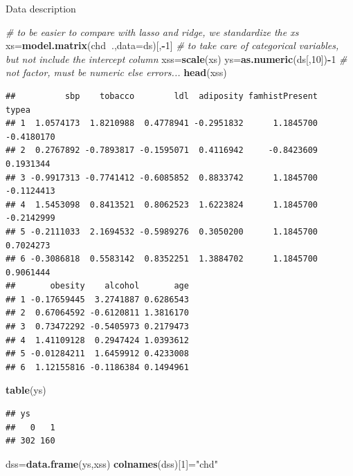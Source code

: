 \documentclass[
  ignorenonframetext,
]{beamer}
\newenvironment{Shaded}{\begin{snugshade}}{\end{snugshade}}
\newcommand{\CommentTok}[1]{\textcolor[rgb]{0.56,0.35,0.01}{\textit{#1}}}
\newcommand{\DataTypeTok}[1]{\textcolor[rgb]{0.13,0.29,0.53}{#1}}
\newcommand{\DecValTok}[1]{\textcolor[rgb]{0.00,0.00,0.81}{#1}}
\newcommand{\KeywordTok}[1]{\textcolor[rgb]{0.13,0.29,0.53}{\textbf{#1}}}
\newcommand{\NormalTok}[1]{#1}
\newcommand{\OperatorTok}[1]{\textcolor[rgb]{0.81,0.36,0.00}{\textbf{#1}}}
\newcommand{\StringTok}[1]{\textcolor[rgb]{0.31,0.60,0.02}{#1}}
\begin{document}
\begin{frame}[fragile]
\begin{block}{Data description}
\begin{Shaded}
\begin{Highlighting}[]
\CommentTok{# to be easier to compare with lasso and ridge, we standardize the xs}
\NormalTok{xs=}\KeywordTok{model.matrix}\NormalTok{(chd}\OperatorTok{~}\NormalTok{.,}\DataTypeTok{data=}\NormalTok{ds)[,}\OperatorTok{-}\DecValTok{1}\NormalTok{] }\CommentTok{# to take care of categorical variables, but not include the intercept column}
\NormalTok{xss=}\KeywordTok{scale}\NormalTok{(xs)}
\NormalTok{ys=}\KeywordTok{as.numeric}\NormalTok{(ds[,}\DecValTok{10}\NormalTok{])}\OperatorTok{-}\DecValTok{1} \CommentTok{# not factor, must be numeric else errors...}
\KeywordTok{head}\NormalTok{(xss)}
\end{Highlighting}
\end{Shaded}

\begin{verbatim}
##          sbp    tobacco        ldl  adiposity famhistPresent      typea
## 1  1.0574173  1.8210988  0.4778941 -0.2951832      1.1845700 -0.4180170
## 2  0.2767892 -0.7893817 -0.1595071  0.4116942     -0.8423609  0.1931344
## 3 -0.9917313 -0.7741412 -0.6085852  0.8833742      1.1845700 -0.1124413
## 4  1.5453098  0.8413521  0.8062523  1.6223824      1.1845700 -0.2142999
## 5 -0.2111033  2.1694532 -0.5989276  0.3050200      1.1845700  0.7024273
## 6 -0.3086818  0.5583142  0.8352251  1.3884702      1.1845700  0.9061444
##       obesity    alcohol       age
## 1 -0.17659445  3.2741887 0.6286543
## 2  0.67064592 -0.6120811 1.3816170
## 3  0.73472292 -0.5405973 0.2179473
## 4  1.41109128  0.2947424 1.0393612
## 5 -0.01284211  1.6459912 0.4233008
## 6  1.12155816 -0.1186384 0.1494961
\end{verbatim}

\begin{Shaded}
\begin{Highlighting}[]
\KeywordTok{table}\NormalTok{(ys)}
\end{Highlighting}
\end{Shaded}

\begin{verbatim}
## ys
##   0   1 
## 302 160
\end{verbatim}

\begin{Shaded}
\begin{Highlighting}[]
\NormalTok{dss=}\KeywordTok{data.frame}\NormalTok{(ys,xss)}
\KeywordTok{colnames}\NormalTok{(dss)[}\DecValTok{1}\NormalTok{]=}\StringTok{"chd"}
\end{Highlighting}
\end{Shaded}


\end{block}
\end{frame}
\end{document}
